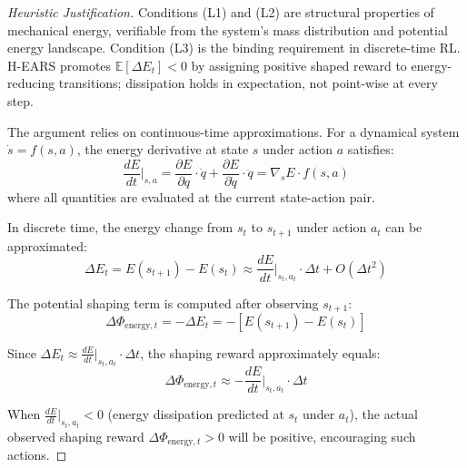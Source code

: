 \documentclass[journal]{IEEEtran}
\begin{document}
	\begin{proof}[Heuristic Justification]
		Conditions (L1) and (L2) are structural properties of mechanical energy, verifiable from the system's mass distribution and potential energy landscape. Condition (L3) is the binding requirement in discrete-time RL. H-EARS promotes $\mathbb{E}[\Delta E_t]<0$ by assigning positive shaped reward to energy-reducing transitions; dissipation holds in expectation, not point-wise at every step.
		
		The argument relies on continuous-time approximations. For a dynamical system $\dot{s}=f(s,a)$, the energy derivative at state $s$ under action $a$ satisfies:
		\begin{equation}
			\frac{dE}{dt}\Big|_{s,a} = \frac{\partial E}{\partial q}\cdot\dot{q} + \frac{\partial E}{\partial\dot{q}}\cdot\ddot{q} = \nabla_s E \cdot f(s,a)
		\end{equation}
		where all quantities are evaluated at the current state-action pair.
		
		In discrete time, the energy change from $s_t$ to $s_{t+1}$ under action $a_t$ can be approximated:
		\begin{equation}
			\Delta E_t = E(s_{t+1}) - E(s_t) \approx \frac{dE}{dt}\Big|_{s_t,a_t} \cdot \Delta t + O(\Delta t^2)
		\end{equation}
		
		The potential shaping term is computed after observing $s_{t+1}$:
		\begin{equation}
			\Delta\Phi_{\text{energy},t} = -\Delta E_t = -[E(s_{t+1}) - E(s_t)]
		\end{equation}
		
		Since $\Delta E_t \approx \frac{dE}{dt}\big|_{s_t,a_t} \cdot \Delta t$, the shaping reward approximately equals:
		\begin{equation}
			\Delta\Phi_{\text{energy},t} \approx -\frac{dE}{dt}\Big|_{s_t,a_t} \cdot \Delta t
		\end{equation}
		
		When $\frac{dE}{dt}\big|_{s_t,a_t} < 0$ (energy dissipation predicted at $s_t$ under $a_t$), the actual observed shaping reward $\Delta\Phi_{\text{energy},t} > 0$ will be positive, encouraging such actions.
		

\end{proof}
\end{document}
